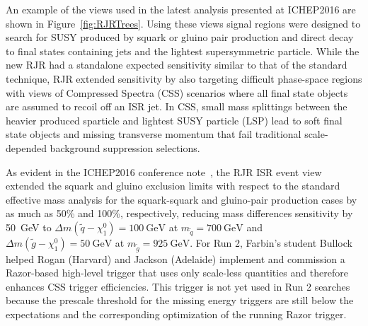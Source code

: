 An example of the views used in the latest analysis presented at
ICHEP2016 are shown in Figure~\ref{fig:RJRTrees}. Using these views
signal regions were designed to search for SUSY produced by squark or
gluino pair production and direct decay to final states containing
jets and the lightest supersymmetric particle. While the new RJR had a
standalone expected sensitivity similar to that of the standard
technique, RJR extended sensitivity by also targeting difficult
phase-space regions with views of Compressed Spectra (CSS) scenarios
where all final state objects are assumed to recoil off an ISR jet. In
CSS, small mass splittings between the heavier produced sparticle and
lightest SUSY particle (LSP) lead to soft final state objects and
missing transverse momentum that fail traditional scale-depended
background suppression selections.

As evident in the ICHEP2016 conference note~\cite{}, the RJR ISR event
view extended the squark and gluino exclusion limits with respect to
the standard effective mass analysis for the squark-squark and
gluino-pair production cases by as much as 50\% and 100\%,
respectively, reducing mass differences sensitivity by 50~GeV to
$\Delta m(\tilde{q} -
\chi_1^0) = 100~\mathrm{GeV}$ at $m_{\tilde{q}} = 700~\mathrm{GeV}$  and 
$\Delta m(\tilde{g} -\chi_1^0) = 50~\mathrm{GeV}$ at $m_{\tilde{g}} =
925~\mathrm{GeV}$. For Run 2, Farbin's student Bullock helped Rogan
(Harvard) and Jackson (Adelaide) implement and commission a
Razor-based high-level trigger that uses only scale-less quantities
and therefore enhances CSS trigger efficiencies. This trigger is not
yet used in Run 2 searches because the prescale threshold for the
missing energy triggers are still below the expectations and the
corresponding optimization of the running Razor trigger.

